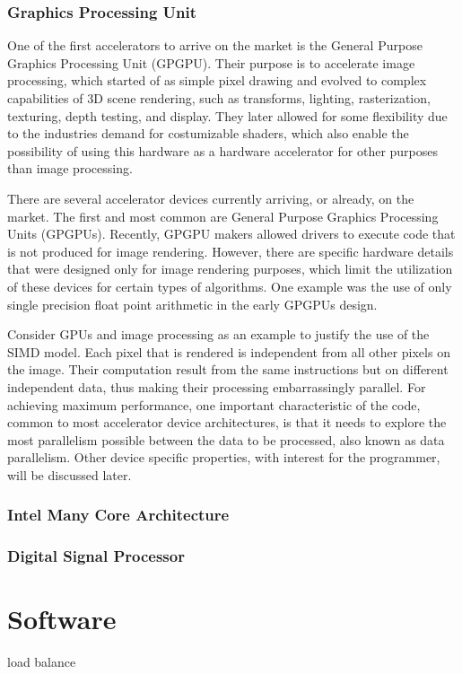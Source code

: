 \subsubsection*{Graphics Processing Unit}
\label{GPU}

One of the first accelerators to arrive on the market is the General Purpose Graphics Processing Unit (GPGPU). Their purpose is to accelerate image processing, which started of as simple pixel drawing and evolved to complex capabilities of 3D scene rendering, such as transforms, lighting, rasterization, texturing, depth testing, and display. They later allowed for some flexibility due to the industries demand for costumizable shaders, which also enable the possibility of using this hardware as a hardware accelerator for other purposes than image processing.



There are several accelerator devices currently arriving, or already, on the market. The first and most common are General Purpose Graphics Processing Units (GPGPUs). Recently, GPGPU makers allowed drivers to execute code that is not produced for image rendering. However, there are specific hardware details that were designed only for image rendering purposes, which limit the utilization of these devices for certain types of algorithms. One example was the use of only single precision float point arithmetic in the early GPGPUs design.

Consider GPUs and image processing as an example to justify the use of the SIMD model. Each pixel that is rendered is independent from all other pixels on the image. Their computation result from the same instructions but on different independent data, thus making their processing embarrassingly parallel. For achieving maximum performance, one important characteristic of the code, common to most accelerator device architectures, is that it needs to explore the most parallelism possible between the data to be processed, also known as data parallelism. Other device specific properties, with interest for the programmer, will be discussed later.

\subsubsection*{Intel Many Core Architecture}
\label{MIC}

\subsubsection*{Digital Signal Processor}
\label{DSP}

\section{Software}
\label{Software}

load balance
